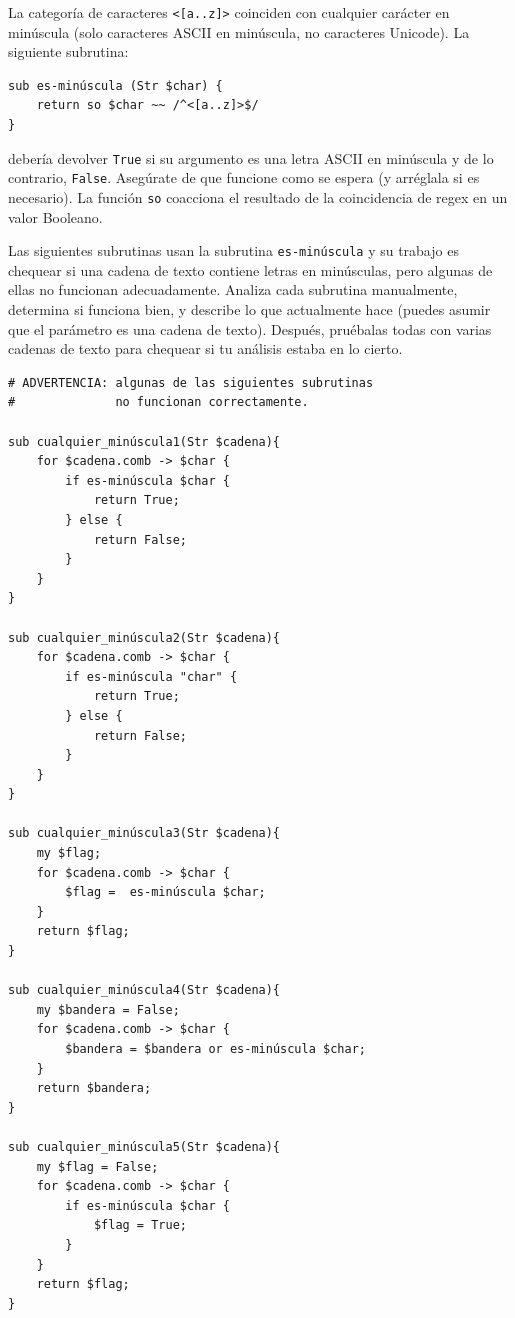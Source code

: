\begin{exercise}

\label{islower}
La categoría de caracteres \verb|<[a..z]>| coinciden con cualquier
carácter en minúscula (solo caracteres ASCII en minúscula, no caracteres
Unicode). La siguiente subrutina:

\begin{lstlisting}
sub es-minúscula (Str $char) { 
    return so $char ~~ /^<[a..z]>$/
}
\end{lstlisting}

debería devolver {\tt True} si su argumento es una letra ASCII
en minúscula y de lo contrario, {\tt False}. Asegúrate de que 
funcione como se espera (y arréglala si es necesario). La 
función {\tt so} coacciona el resultado de la coincidencia de regex 
en un valor Booleano.

Las siguientes subrutinas usan la subrutina {\tt es-minúscula}
y su trabajo es chequear si una cadena de texto contiene 
letras en minúsculas, pero algunas de ellas no funcionan 
adecuadamente. Analiza cada subrutina manualmente, 
determina si funciona bien, y describe lo que actualmente
hace (puedes asumir que el parámetro es una cadena de texto).
Después, pruébalas todas con varias cadenas de texto para chequear
si tu análisis estaba en lo cierto.

\begin{lstlisting}
# ADVERTENCIA: algunas de las siguientes subrutinas
#              no funcionan correctamente.

sub cualquier_minúscula1(Str $cadena){
    for $cadena.comb -> $char {
        if es-minúscula $char {
            return True;
        } else {
            return False;
        }
    }
}

sub cualquier_minúscula2(Str $cadena){
    for $cadena.comb -> $char {
        if es-minúscula "char" {
            return True;
        } else {
            return False;
        }
    }
}

sub cualquier_minúscula3(Str $cadena){
    my $flag;
    for $cadena.comb -> $char {
        $flag =  es-minúscula $char;
    }
    return $flag;
}

sub cualquier_minúscula4(Str $cadena){
    my $bandera = False;
    for $cadena.comb -> $char {
        $bandera = $bandera or es-minúscula $char;
    }
    return $bandera;
}

sub cualquier_minúscula5(Str $cadena){
    my $flag = False;
    for $cadena.comb -> $char {
        if es-minúscula $char {
            $flag = True;
        }
    }
    return $flag;
}


\end{lstlisting}
\end{exercise}
